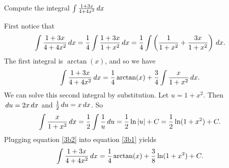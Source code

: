 \documentclass[nooutcomes]{ximera}
\begin{document}
\begin{problem}

Compute the integral $ \int \frac{1+3x}{4+4x^2} \,d x$
  \begin{freeResponse}
		First notice that
		\begin{equation*}
			\int \frac{1+3x}{4+4x^2} \,d x = \frac{1}{4} \int \frac{1+3x}{1+x^2} \,d x = \frac{1}{4} \int \left( \frac{1}{1+x^2} + \frac{3x}{1+x^2} \right) \,d x.
		\end{equation*}
		The first integral is $\arctan(x)$, and so we have
		\begin{equation}\label{3b1}
			\int \frac{1+3x}{4+4x^2} \,d x = \frac{1}{4} \arctan(x) + \frac{3}{4} \int \frac{x}{1+x^2} \,d x.
		\end{equation}
		We can solve this second integral by substitution.
    Let $u=1+x^2$.
    Then $\,d u = 2x \,d x$ and $\frac{1}{2} \,d u = x \,d x$.
    So
		\begin{equation}\label{3b2}
			\int \frac{x}{1+x^2} \,d x = \frac{1}{2} \int \frac{1}{u} \,d u = \frac{1}{2} \ln|u| +C = \frac{1}{2} \ln(1+x^2) + C.
		\end{equation}
		Plugging equation \eqref{3b2} into equation \eqref{3b1} yields
		\begin{equation*}
			\int \frac{1+3x}{4+4x^2} \,d x = \frac{1}{4} \arctan(x) + \frac{3}{8} \ln(1+x^2) + C.
		\end{equation*}
	\end{freeResponse}
\end{problem}
\end{document}
